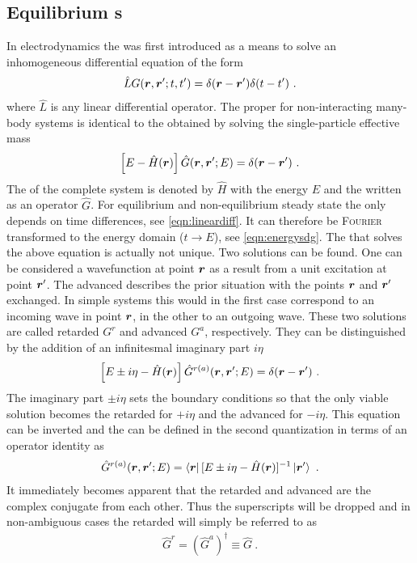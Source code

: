 \subsection{Equilibrium \cgfnc s}
In electrodynamics the \gfnc{} was first introduced as a means to solve an inhomogeneous differential equation of the form
\begin{align}
\hat{L}G(\boldsymbol{r},\boldsymbol{r}';t,t') = \delta(\boldsymbol{r}-\boldsymbol{r}')\delta(t-t')\ .
\label{eqn:lineardiff}
\end{align}
where $\hat{L}$ is any linear differential operator. The proper \gfnc{} for non-interacting many-body systems is identical to the \gfnc{} obtained by solving the single-particle effective mass \sdg{} \cite{ferry1999transport}
\begin{align}
\left[ E -\hat{H}(\boldsymbol{r})\right] \hat{G}(\boldsymbol{r},\boldsymbol{r}';E) = \delta (\boldsymbol{r}-\boldsymbol{r}')\ .
\label{eqn:energysdg}
\end{align}
The \hamil{} of the complete system is denoted by $\hat{H}$ with the energy $E$ and the \gfnc{} written as an operator $\hat{G}$.
For equilibrium \cite{fetter2003quantum} and non-equilibrium steady state \cite{haug2008quantum} the \gfnc{} only depends on time differences, see \cref{eqn:lineardiff}. It can therefore be \textsc{Fourier} transformed to the energy domain ($t \rightarrow E$), see \cref{eqn:energysdg}. The \gfnc{} that solves the above equation is actually not unique. Two solutions can be found. One can be considered a wavefunction at point $\boldsymbol{r}$ as a result from a unit excitation at point $\boldsymbol{r}'$. The advanced \gfnc{} describes the prior situation with the points $\boldsymbol{r}$ and $\boldsymbol{r}'$ exchanged. In simple systems this would in the first case correspond to an incoming wave in point $\boldsymbol{r}$, in the other to an outgoing wave.
These two solutions are called retarded \gfnc{} $G^r$ and advanced \gfnc{} $G^a$, respectively. They can be distinguished by the addition of an infinitesmal imaginary part $i\eta$
\begin{align}
\left[ E \pm i \eta -\hat{H}(\boldsymbol{r})\right] \hat{G}^{r(a)}(\boldsymbol{r},\boldsymbol{r}';E) = \delta (\boldsymbol{r}-\boldsymbol{r}')\ .
\end{align}
The imaginary part $\pm i\eta$ sets the boundary conditions so that the only viable solution becomes the retarded \gfnc{} for $+i\eta$ and the advanced \gfnc{} for $-i \eta$.
This equation can be inverted and the \gfnc{} can be defined in the second quantization in terms of an operator identity as
\begin{align}
\hat{G}^{r(a)}(\boldsymbol{r},\boldsymbol{r}';E) = \left< \boldsymbol{r} \right| [E\pm i \eta - \hat{H}(\boldsymbol{r})]^{-1} \left| \boldsymbol{r}' \right>\ .
\end{align}
It immediately becomes apparent that the retarded and advanced \gfnc{} are the complex conjugate from each other. Thus the superscripts will be dropped and in non-ambiguous cases the retarded \gfnc{} will simply be referred to as \gfnc{}
\begin{align}
\hat{G}^r = (\hat{G}^a)^{\dagger} \equiv \hat{G}\ .
\end{align}
